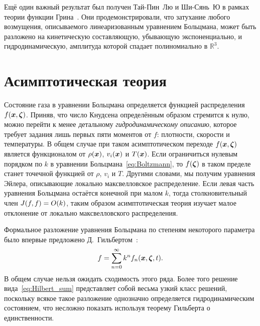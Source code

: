 Ещё один важный результат был получен Тай-Пин~Лю и Ши-Сянь~Ю в рамках теории функции Грина~\cite{Liu2004green,Liu2006}.
Они продемонстрировали, что затухание любого возмущения, описываемого линеаризованным уравнением Больцмана,
может быть разложено на кинетическую составляющую, убывающую экспоненциально,
и гидродинамическую, амплитуда которой спадает полиномиально в \(\mathbb{R}^3\).

\section{Асимптотическая теория} \label{sect:asymptotic}

Состояние газа в уравнении Больцмана определяется функцией распределения \(f({\boldsymbol{x}},{\boldsymbol{\zeta}})\).
Приняв, что число Кнудсена определённым образом стремится к нулю, можно перейти к менее детальному
\emph{гидродинамическому описанию}, которое требует задания лишь первых пяти моментов от \(f\):
плотности, скорости и температуры.
В общем случае при таком асимптотическом переходе \(f({\boldsymbol{x}},{\boldsymbol{\zeta}})\) является функционалом от
\(\rho({\boldsymbol{x}})\), \(v_i({\boldsymbol{x}})\) и \(T({\boldsymbol{x}})\). Если ограничиться нулевым порядком по \(k\)
в уравнении Больцмана~\eqref{eq:Boltzmann}, то \(f({\boldsymbol{\zeta}})\) в таком пределе станет точечной
функцией от \(\rho\), \(v_i\) и \(T\). Другими словами, мы получим уравнения Эйлера,
описывающие локально максвелловское распределение.
Если левая часть уравнения Больцмана остаётся конечной при малом \(k\),
тогда столкновительный член \(J(f,f) = O(k)\), таким образом асимптотическая теория
изучает малое отклонение от локально максвелловского распределения.

Формальное разложение уравнения Больцмана по степеням некоторого параметра было впервые
предложено Д.~Гильбертом~\cite{Hilbert1912, Hilbert1924}:
\begin{equation}\label{eq:Hilbert_sum}
    f = \sum_{n=0}^\infty k^n f_n({\boldsymbol{x}},{\boldsymbol{\zeta}},t).
\end{equation}
В общем случае нельзя ожидать сходимость этого ряда.
Более того решение вида~\eqref{eq:Hilbert_sum} представляет собой весьма узкий класс решений,
поскольку всякое такое разложение однозначно определяется гидродинамическим состоянием,
что несложно показать используя теорему Гильберта о единственности.

